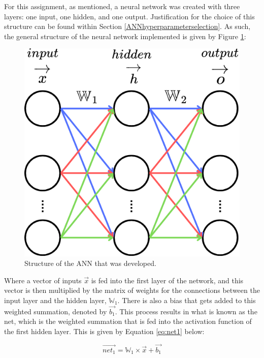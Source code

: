 \documentclass[a4paper]{article}
\begin{document}
For this assignment, as mentioned, a neural network was created with three layers: one input, one hidden, and one output. Justification for the choice of this structure can be found within Section \ref{ANNhyperparameterselection}. As such, the general structure of the neural network implemented is given by Figure \ref{fig:annstructure}:

\begin{figure}[h!]
    \centering
    \includegraphics[scale = 0.5]{images/annstructure.png}
    \caption{Structure of the ANN that was developed.}
    \label{fig:annstructure}
\end{figure}

Where a vector of inputs $\overrightarrow{x}$ is fed into the first layer of the network, and this vector is then multiplied by the matrix of weights for the connections between the input layer and the hidden layer, $\mathbb W_1$. There is also a bias that gets added to this weighted summation, denoted by $\overrightarrow{b_1}$. This process results in what is known as the net, which is the weighted summation that is fed into the activation function of the first hidden layer. This is given by Equation \ref{eq:net1} below:

\begin{equation}
    \label{eq:net1}
    \overrightarrow{net_{1}} = \mathbb W_{1} \times \overrightarrow{x} + \overrightarrow{b_1}
\end{equation}
\end{document}
